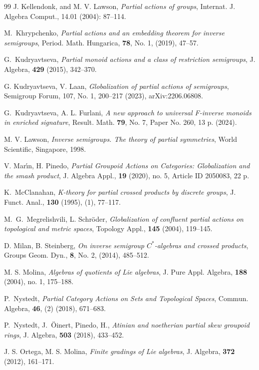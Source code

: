 \documentclass{amsart}
\newcommand{\0}{{\vartheta}}
\theoremstyle{definition}
\theoremstyle{remark}
\numberwithin{equation}{section}
\newtheorem*{Theorem A}{\textbf{Theorem A}}
\newtheorem*{Corollary E}{\textbf{Corollary E}}
\newtheorem*{Corollary F}{\textbf{Corollary F}}
\newtheorem*{Theorem B}{\textbf{Theorem B}}
\newtheorem*{Theorem C}{\textbf{Theorem C}}
\newtheorem*{Theorem D}{\textbf{Theorem B}}
\newtheorem*{p a}{\textbf{Proof of  Theorem A}}
\newtheorem*{p b}{\textbf{Proof of Theorem B}}
\newtheorem*{p c}{\textbf{Proof of  Theorem C}}
\newtheorem*{p d}{\textbf{Proof of  Theorem D}}
\begin{document}
\begin{thebibliography}{99}
J. Kellendonk, and M. V. Lawson, {\em Partial actions of groups},  Internat. J. Algebra Comput., 14.01 (2004): 87--114.

 M.\ Khrypchenko, {\em Partial actions and an embedding  theorem for inverse semigroups},
 Period. Math. Hungarica, {\bf 78}, No. 1,  (2019),
47--57.


 G.\ Kudryavtseva, {\em Partial monoid actions and a class of restriction semigroups}, 
 J. Algebra,  {\bf 429} (2015), 342--370.
 
  G. Kudryavtseva, V. Laan, {\em Globalization of partial actions of semigroups}, 
 Semigroup Forum, 107, No. 1, 200--217 (2023),
arXiv:2206.06808.

 G.\ Kudryavtseva, A. L. Furlani,
{\em A new approach to universal F-inverse monoids in enriched signature},
Result. Math. {\bf 79}, No. 7, Paper No. 260, 13 p. (2024).

  M. V. Lawson, {\em Inverse semigroups. The theory of partial symmetries}, World Scientific, Singapore, 1998.

  V. Mar\'{\i}n, H. Pinedo, {\em Partial Groupoid Actions on Categories: Globalization and the smash 
product},  J. Algebra Appl., {\bf 19} (2020), no. 5, Article ID 2050083, 22 p.

 K.\ McClanahan,   {\em K-theory for partial crossed products by discrete groups},
 J. Funct. Anal., {\bf 130}  (1995), (1), 77--117.

  M.\ G.\ Megrelishvili, L. Schr\"oder, {\em Globalization of confluent partial actions on topological and 
metric spaces},  Topology Appl., {\bf 145}  (2004), 119--145.


 D. Milan, B. Steinberg,  {\em On inverse semigroup $C^*$-algebras and crossed products}, 
 Groups Geom. Dyn., {\bf 8}, No. 2, (2014),  485--512.

 M. S. Molina, {\em Algebras of quotients of Lie algebras},  J. Pure Appl. Algebra, {\bf 188} (2004), no. 1, 175--188.

 P.\ Nystedt, {\em Partial Category Actions on Sets and Topological Spaces},  
 Commun. Algebra, {\bf 46},  (2)   (2018), 671--683.

 P.\ Nystedt, J.\ {\"O}inert, Pinedo, H., {\em Atinian and noetherian partial skew groupoid rings},   J. Algebra,   {\bf 503}  (2018), 433--452.

 J. S. Ortega, M. S. Molina, 
{\em Finite gradings of Lie algebras}, 
J. Algebra, {\bf 372} (2012), 161--171.


\end{thebibliography}
\end{document}
